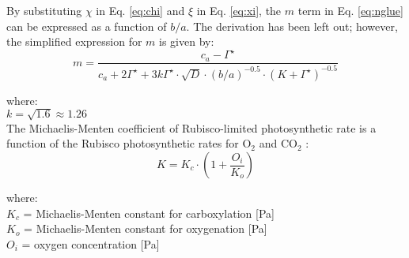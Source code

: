 \noindent By substituting $\chi$ in Eq. \ref{eq:chi} and $\xi$ in Eq. \ref{eq:xi}, the $m$ term in Eq. \ref{eq:nglue} can be expressed as a function of $b/a$.  
The derivation has been left out; however, the simplified expression for $m$ is given by:
\begin{equation}
\label{eq:msimp}
    m = \frac{c_a - \Gamma^{\star}}{c_a + 2 \Gamma^{\star} 
    + 3 k \Gamma^{\star} \cdot \sqrt{D} \cdot 
    \left( b/a \right)^{-0.5} \cdot \left( K + \Gamma^{\star} \right)^{-0.5}}
\end{equation}

\noindent where: \\
\indent $k = \sqrt{1.6} \approx 1.26$ \\

The Michaelis-Menten coefficient of Rubisco-limited photosynthetic rate is a function of the Rubisco photosynthetic rates for O$_2$ and CO$_2$ \parencite{farquhar80}:
%
%
\begin{equation}
\label{eq:michaelis}
	K=K_c \cdot \left( 1 + \frac{O_i}{K_o} \right)
\end{equation}

\noindent where:\\
\indent $K_c$ = Michaelis-Menten constant for carboxylation [Pa]\\
\indent $K_o$ = Michaelis-Menten constant for oxygenation [Pa]\\
\indent $O_i$ = oxygen concentration [Pa]\\

